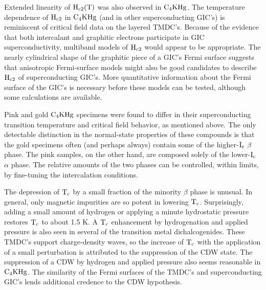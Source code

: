         Extended linearity of  $\rm  H_{c2}(T)$ was  also  observed in $\rm
C_4KHg$.  The temperature dependence   of $\rm  H_{c2}$  in $\rm   C_4KHg$ (and  in other
superconducting GIC's\cite{koike80,iye82}) is reminiscent of critical field
data   on  the layered   TMDC's.\cite{ikebe80,dalrymple84}  Because  of the
evidence that both intercalant  and graphitic electrons participate  in GIC
superconductivity, multiband  models of  $\rm H_{c2}$  would  appear  to be
appropriate.\cite{aljishi88,entel76}  The nearly cylindrical   shape of the
graphitic piece   of   a  GIC's   Fermi   surface\cite{I94}  suggests  that
anisotropic Fermi-surface models might also  be good candidates to describe
$\rm  H_{c2}$    of superconducting   GIC's.\cite{butler80,youngner80} More
quantitative information about the Fermi surface of the GIC's is necessary
before    these models can   be  tested,   although   some calculations are
available.\cite{holzwarth88}

        Pink and gold $\rm C_4KHg$ specimens were found  to differ in their
superconducting transition  temperature   and critical field   behavior, as
mentioned   above.  The  only   detectable distinction in the  normal-state
properties of these compounds is that the gold specimens often (and perhaps
always)  contain some of   the higher-$\rm  I_c$   $\beta$ phase.  The pink
samples, on the other  hand, are  composed solely  of the  lower-$\rm  I_c$
$\alpha$ phase.  The relative amounts of the two phases  can be controlled,
within limits, by fine-tuning the intercalation conditions.

        The  depression of $\rm T_c$ by  a small fraction  of  the minority
$\beta$ phase is  unusual.  In  general, only magnetic   impurities are  so
potent in lowering $\rm   T_c$.\cite{tinkham80}  Surprisingly,  adding a  small
amount of hydrogen or applying a minute hydrostatic pressure\cite{delong83}
restores   $\rm  T_c$  to   about  1.5 K.   A   $\rm   T_c$ enhancement  by
hydrogenation   and  applied  pressure is   also  seen   in several of  the
transition    metal  dichalcogenides.\cite{friend79}  These  TMDC's support
charge-density waves,\cite{wilson75} so the increase  of $\rm T_c$ with the
application of a small perturbation is attributed to the suppression of the
CDW state.\cite{friend79} The suppression of  a CDW by hydrogen and applied
pressure also    seems reasonable  in   $\rm  C_4KHg$.\cite{delong83}   The
similarity of the Fermi surfaces  of  the TMDC's and  superconducting GIC's
lends additional credence to the CDW hypothesis.\cite{inoshita77}

